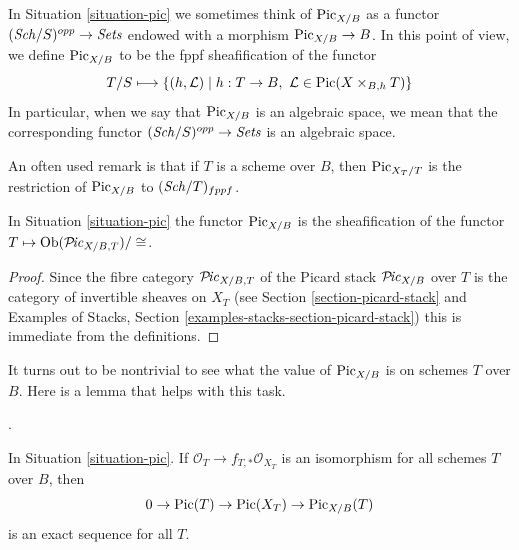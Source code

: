 \noindent
In Situation \ref{situation-pic} we sometimes think of
$\mathrm{Pic}_{X/B}$ as a functor $(\mathit{Sch}/S)^{opp} \to \textit{Sets}$
endowed with a morphism $\mathrm{Pic}_{X/B} \to B$. In this point
of view, we define $\mathrm{Pic}_{X/B}$ to be the fppf sheafification of
the functor
$$
T/S \longmapsto \{(h, \mathcal{L}) \mid
h : T \to B,\ \mathcal{L} \in \mathop{\mathrm{Pic}}\nolimits(X \times_{B, h} T)\}
$$
In particular, when we say that $\mathrm{Pic}_{X/B}$ is an algebraic space,
we mean that the corresponding functor
$(\mathit{Sch}/S)^{opp} \to \textit{Sets}$ is an algebraic space.

\medskip\noindent
An often used remark is that if $T$ is a scheme over $B$, then
$\mathrm{Pic}_{X_T/T}$ is the restriction of $\mathrm{Pic}_{X/B}$ to
$(\mathit{Sch}/T)_{fppf}$.

\begin{lemma}
\label{lemma-pic-over-pic}
In Situation \ref{situation-pic}
the functor $\mathrm{Pic}_{X/B}$ is the sheafification of
the functor $T \mapsto \mathop{\mathrm{Ob}}\nolimits(\mathcal{P}\!\mathit{ic}_{X/B, T})/\cong$.
\end{lemma}

\begin{proof}
Since the fibre category $\mathcal{P}\!\mathit{ic}_{X/B, T}$ of the Picard stack
$\mathcal{P}\!\mathit{ic}_{X/B}$ over $T$ is the category of invertible sheaves on
$X_T$ (see Section \ref{section-picard-stack} and
Examples of Stacks, Section \ref{examples-stacks-section-picard-stack})
this is immediate from the definitions.
\end{proof}

\noindent
It turns out to be nontrivial to see what the value of $\mathrm{Pic}_{X/B}$
is on schemes $T$ over $B$. Here is a lemma that helps with this task.

\begin{lemma}
\label{lemma-flat-geometrically-connected-fibres}
\begin{reference}
\cite[Expos\'e 232, Proposition 2.1 and Corollary 2.4]{FGA}.
\end{reference}
In Situation \ref{situation-pic}.
If $\mathcal{O}_T \to f_{T, *}\mathcal{O}_{X_T}$ is an isomorphism
for all schemes $T$ over $B$, then
$$
0 \to \mathop{\mathrm{Pic}}\nolimits(T) \to \mathop{\mathrm{Pic}}\nolimits(X_T) \to \mathrm{Pic}_{X/B}(T)
$$
is an exact sequence for all $T$.
\end{lemma}

